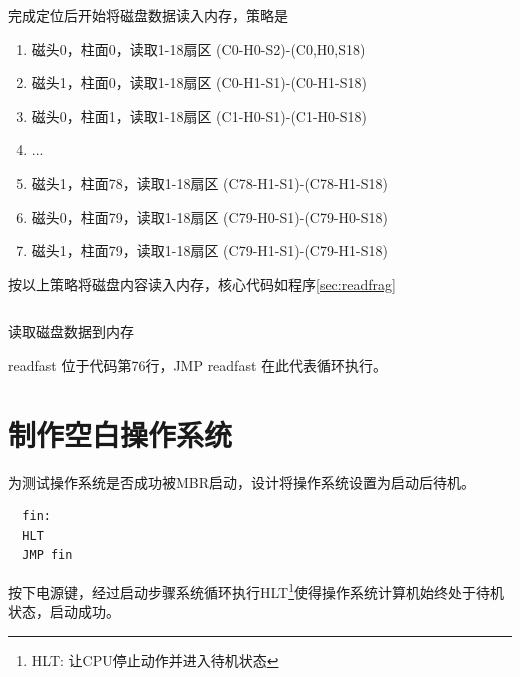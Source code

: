 完成定位后开始将磁盘数据读入内存，策略是
\begin{enumerate}
\item 磁头0，柱面0，读取1-18扇区 (C0-H0-S2)-(C0,H0,S18)
\item 磁头1，柱面0，读取1-18扇区 (C0-H1-S1)-(C0-H1-S18)
\item 磁头0，柱面1，读取1-18扇区 (C1-H0-S1)-(C1-H0-S18)
\item ...
\item 磁头1，柱面78，读取1-18扇区 (C78-H1-S1)-(C78-H1-S18)
\item 磁头0，柱面79，读取1-18扇区 (C79-H0-S1)-(C79-H0-S18)
\item 磁头1，柱面79，读取1-18扇区 (C79-H1-S1)-(C79-H1-S18)
\end{enumerate}

按以上策略将磁盘内容读入内存，核心代码如程序\ref{sec:readfrag}
\begin{listing}[H]
  \inputminted[tabsize=2, firstline=138, lastline=147,
  linenos=true]{nasm}{../ZOS/src/kernel/ipl09.nas}
  \caption{读取磁盘数据到内存}
  \label{sec:readfrag}
\end{listing}
readfast 位于代码第76行，JMP readfast 在此代表循环执行。

\section{制作空白操作系统}

为测试操作系统是否成功被MBR启动，设计将操作系统设置为启动后待机。

\begin{verbatim}
  fin:
  HLT
  JMP fin
\end{verbatim}

按下电源键，经过启动步骤系统循环执行HLT\footnote{HLT: 让CPU停止动作并进入待机状态\cite{30_osKawaiHidemi200630}}使得操作系统计算机始终处于待机状态，启动成功。

